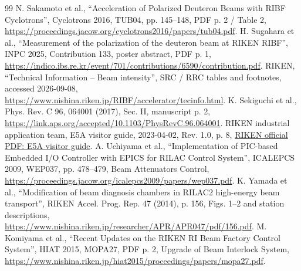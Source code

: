 \documentclass[11pt,a4paper]{article}
\begin{document}
\begin{thebibliography}{99}
 N. Sakamoto et al., ``Acceleration of Polarized Deuteron Beams with RIBF Cyclotrons'', Cyclotrons 2016, TUB04, pp. 145--148, PDF p. 2 / Table 2,\newline
\url{https://proceedings.jacow.org/cyclotrons2016/papers/tub04.pdf}.
 H. Sugahara et al., ``Measurement of the polarization of the deuteron beam at RIKEN RIBF'', INPC 2025, Contribution 133, poster abstract, PDF p. 1,\newline
\url{https://indico.ibs.re.kr/event/701/contributions/6590/contribution.pdf}.
 RIKEN, ``Technical Information -- Beam intensity'', SRC / RRC tables and footnotes, accessed 2026-09-08,\newline
\url{https://www.nishina.riken.jp/RIBF/accelerator/tecinfo.html}.
 K. Sekiguchi et al., Phys. Rev. C 96, 064001 (2017), Sec. II, manuscript p. 2,\newline
\url{https://link.aps.org/accepted/10.1103/PhysRevC.96.064001}.
 RIKEN industrial application team, E5A visitor guide, 2023-04-02, Rev. 1.0, p. 8,\newline
\href{https://ribf.riken.jp/sisetu-kyoyo/HIbeam/doc/E5Aadv_\%E8\%A6\%8B\%E5\%AD\%A6\%E6\%A1\%88\%E5\%86\%85\%E7\%94\%A8\%E8\%B3\%87\%E6\%96\%99.pdf}{RIKEN official PDF: E5A visitor guide}.
 A. Uchiyama et al., ``Implementation of PIC-based Embedded I/O Controller with EPICS for RILAC Control System'', ICALEPCS 2009, WEP037, pp. 478--479, Beam Attenuators Control,\newline
\url{https://proceedings.jacow.org/icalepcs2009/papers/wep037.pdf}.
 K. Yamada et al., ``Modification of beam diagnosis chambers in RILAC2 high-energy beam transport'', RIKEN Accel. Prog. Rep. 47 (2014), p. 156, Figs. 1--2 and station descriptions,\newline
\url{https://www.nishina.riken.jp/researcher/APR/APR047/pdf/156.pdf}.
 M. Komiyama et al., ``Recent Updates on the RIKEN RI Beam Factory Control System'', HIAT 2015, MOPA27, PDF p. 2, Upgrade of Beam Interlock System,\newline
\url{https://www.nishina.riken.jp/hiat2015/proceedings/papers/mopa27.pdf}.


\end{thebibliography}
\end{document}

